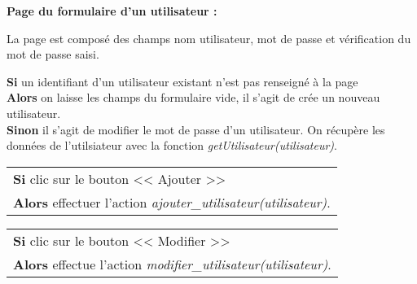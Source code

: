             
            \begin{paragraphe}
                \textbf{Page du formulaire d'un utilisateur :}
            \end{paragraphe}
            
            \begin{paragraphe}
                La page est composé des champs nom utilisateur, mot de passe et vérification du mot de passe saisi.
            \end{paragraphe}

            \begin{paragraphe}
                \textbf{Si} un identifiant d'un utilisateur existant n'est pas renseigné à la page \\
                \textbf{Alors} on laisse les champs du formulaire vide, il s'agit de crée un nouveau utilisateur. \\
                \textbf{Sinon} il s'agit de modifier le mot de passe d'un utilisateur. On récupère les données de l'utilsiateur avec la fonction \emph{getUtilisateur(utilisateur)}.
            \end{paragraphe}
            
            \begin{center}
                \begin{tabular}{l}
                    \textbf{Si} clic sur le bouton << Ajouter >> \\
                    \textbf{Alors} effectuer l'action \emph{ajouter\_utilisateur(utilisateur)}.
                \end{tabular}
            \end{center}
            
            
        \newpage
            
            \begin{center}
                \begin{tabular}{l}
                    \textbf{Si} clic sur le bouton << Modifier >> \\
                    \textbf{Alors} effectue l'action \emph{modifier\_utilisateur(utilisateur)}.
                \end{tabular}
            \end{center}
            
